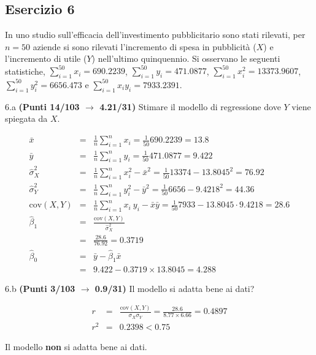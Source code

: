 \documentclass[
  11pt,
]{book}
\theoremstyle{mytheoremstyle}
\theoremstyle{mydefstyle}
\newenvironment{sol}
  {
  \begin{tcolorbox}[enhanced,breakable,arc=0.1mm,boxrule=1pt,colback=white,colframe=iblue,
  title=\bf \fontfamily{lmss}\selectfont \hspace{.5 cm} Soluzione,drop fuzzy shadow]

}{
\end{tcolorbox}
  }
\begin{document}
\subsection{Esercizio 6}\label{esercizio-6-23}

In uno studio sull'efficacia dell'investimento pubblicitario sono stati rilevati, per \(n=50\) aziende si sono rilevati l'incremento di spesa in
pubblicità (\(X\)) e l'incremento di utile (\(Y\)) nell'ultimo quinquennio. Si osservano le seguenti statistiche, \(\sum_{i=1}^{50}x_i=690.2239\), \(\sum_{i=1}^{50}y_i=471.0877\),
\(\sum_{i=1}^{50}x_i^2=13373.9607\), \(\sum_{i=1}^{50}y_i^2=6656.473\) e \(\sum_{i=1}^{50}x_iy_i=7933.2391\).

6.a \textbf{(Punti 14/103 \(\rightarrow\) 4.21/31)} Stimare il modello di regressione dove \(Y\) viene spiegata da \(X\).

\begin{sol}
\begin{eqnarray*}
           \bar x &=&\frac 1 n\sum_{i=1}^n x_i = \frac {1}{ 50 }  690.2239 =  13.8 \\
           \bar y &=&\frac 1 n\sum_{i=1}^n y_i = \frac {1}{ 50 }  471.0877 =  9.422 \\
           \hat\sigma_X^2&=&\frac 1 n\sum_{i=1}^n x_i^2-\bar x^2=\frac {1}{ 50 }  13374  - 13.8045 ^2= 76.92 \\
           \hat\sigma_Y^2&=&\frac 1 n\sum_{i=1}^n y_i^2-\bar y^2=\frac {1}{ 50 }  6656  - 9.4218 ^2= 44.36 \\
           \text{cov}(X,Y)&=&\frac 1 n\sum_{i=1}^n x_i~y_i-\bar x\bar y=\frac {1}{ 50 }  7933 - 13.8045 \cdot 9.4218 = 28.6 \\
           \hat\beta_1 &=& \frac{\text{cov}(X,Y)}{\hat\sigma_X^2} \\
                    &=& \frac{ 28.6 }{ 76.92 }  =  0.3719 \\
           \hat\beta_0 &=& \bar y - \hat\beta_1 \bar x\\
                    &=&  9.422 - 0.3719 \times  13.8045 = 4.288 
         \end{eqnarray*}

\end{sol}

6.b \textbf{(Punti 3/103 \(\rightarrow\) 0.9/31)} Il modello si adatta bene ai dati?

\begin{sol}
\begin{eqnarray*}
r&=&\frac{\text{cov}(X,Y)}{\sigma_X\sigma_Y}=\frac{ 28.6 }{ 8.77 \times 6.66 }= 0.4897 \\ 
r^2&=& 0.2398 < 0.75
\end{eqnarray*}

Il modello \textbf{non} si adatta bene ai dati.

\end{sol}
\end{document}
